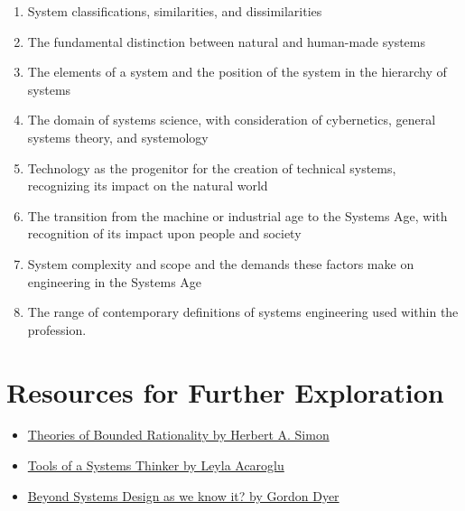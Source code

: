 \begin{enumerate}
	\item System classifications, similarities, and dissimilarities
	\item The fundamental distinction between natural and human-made systems
	\item The elements of a system and the position of the system in the hierarchy of systems
	\item The domain of systems science, with consideration of cybernetics, general systems theory, and systemology
	\item Technology as the progenitor for the creation of technical systems, recognizing its impact on the natural world
	\item The transition from the machine or industrial age to the Systems Age, with recognition of its impact upon people and society
	\item System complexity and scope and the demands these factors make on engineering in the Systems Age
	\item The range of contemporary definitions of systems engineering used within the profession.
\end{enumerate}

\section*{Resources for Further Exploration}
\begin{itemize}
	\item \href{http://innovbfa.viabloga.com/files/Herbert_Simon___theories_of_bounded_rationality___1972.pdf}{Theories of Bounded Rationality by Herbert A. Simon}
	\item \href{https://medium.com/disruptive-design/tools-for-systems-thinkers-the-6-fundamental-concepts-of-systems-thinking-379cdac3dc6a}{Tools of a Systems Thinker by Leyla Acaroglu}
	\item \href{http://www.afscet.asso.fr/resSystemica/Crete02/Dyer.pdf}{Beyond Systems Design as we know it? by Gordon Dyer}
\end{itemize}

